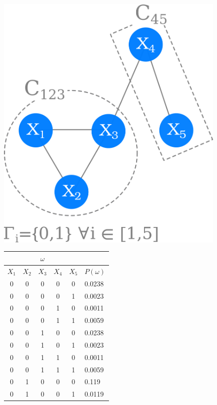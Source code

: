 \begin{figure}
\center
\begin{minipage}{0.3\textwidth}
\includegraphics[scale=0.10]{figures/chapter2/mrf/mrf-example.png}
\end{minipage}%
\begin{minipage}{0.35\textwidth}
\tiny
\begin{tabular}{|c|c|c|c|c|l|}
\hline
\multicolumn{5}{|c|}{$\omega$} & \\
\hline
$X_1$ & $X_2$ & $X_3$ & $X_4$ & $X_5$ & $P(\omega)$\\
\hline
0 & 0 & 0 & 0 & 0 & 0.0238 \\
0 & 0 & 0 & 0 & 1 & 0.0023 \\
0 & 0 & 0 & 1 & 0 & 0.0011 \\
0 & 0 & 0 & 1 & 1 & 0.0059 \\
0 & 0 & 1 & 0 & 0 & 0.0238 \\
0 & 0 & 1 & 0 & 1 & 0.0023 \\
0 & 0 & 1 & 1 & 0 & 0.0011 \\
0 & 0 & 1 & 1 & 1 & 0.0059 \\
0 & 1 & 0 & 0 & 0 & 0.119 \\
0 & 1 & 0 & 0 & 1 & 0.0119 \\

\end{tabular}
\end{minipage}
\end{figure}
